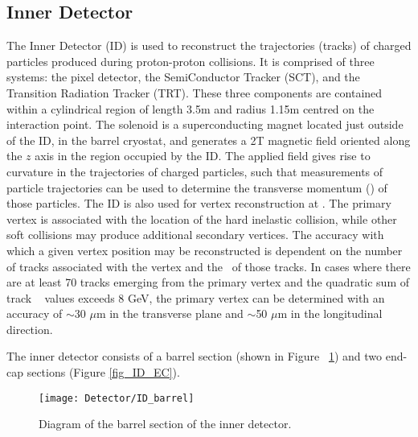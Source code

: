 \subsection{Inner Detector}
The Inner Detector (ID) is used to reconstruct the trajectories (tracks) of charged particles produced during proton-proton collisions. It is comprised of three systems: the pixel detector, the SemiConductor Tracker (SCT), and the Transition Radiation Tracker (TRT). These three components are contained within a cylindrical region of length 3.5m and radius 1.15m centred on the \atlas interaction point. The \atlas solenoid is a superconducting magnet located just outside of the ID, in the barrel cryostat, and generates a 2T magnetic field oriented along the $z$ axis in the region occupied by the ID. The applied field gives rise to curvature in the trajectories of charged particles, such that measurements of particle trajectories can be used to determine the transverse momentum (\pt) of those particles. The ID is also used for vertex reconstruction at \atlas. The primary vertex is associated with the location of the hard inelastic collision, while other soft collisions may produce additional secondary vertices. The accuracy with which a given vertex position may be reconstructed is dependent on the number of tracks associated with the vertex and the \pt~of those tracks. In cases where there are at least 70 tracks emerging from the primary vertex and the quadratic sum of track \pt~ values exceeds 8 GeV, the primary vertex can be determined with an accuracy of $\sim$30 $\mu$m in the transverse plane and $\sim$50 $\mu$m in the longitudinal direction\cite{vertex_ref}.



The inner detector consists of a barrel section (shown in Figure ~\ref{fig_ID_barrel}) and two end-cap sections (Figure \ref{fig_ID_EC}). 
\begin{figure}[p]
\begin{center}
\texttt{[image: Detector/ID\_barrel]}
\end{center}
\caption{Diagram of the barrel section of the inner detector.}
\label{fig_ID_barrel}
\end{figure}

